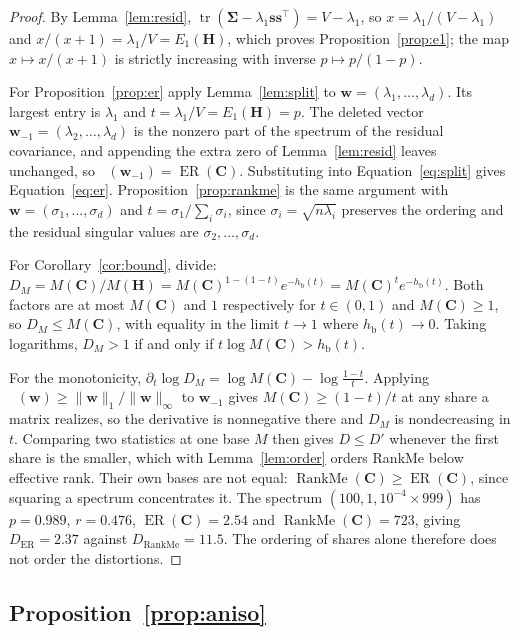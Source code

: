 \documentclass{article}
\theoremstyle{spaced}
\theoremstyle{definition}
\DeclareMathOperator{\ER}{ER}
\DeclareMathOperator{\RankMe}{RankMe}
\DeclareMathOperator{\Hexp}{H_{\exp}}
\DeclareMathOperator{\tr}{tr}
\newcommand{\bH}{\mathbf{H}}
\newcommand{\bC}{\mathbf{C}}
\newcommand{\bs}{\mathbf{s}}
\newcommand{\bw}{\mathbf{w}}
\newcommand{\bSig}{\boldsymbol{\Sigma}}
\newcommand{\hb}{h_{\mathrm{b}}}
\begin{document}
\begin{proof}
By Lemma~\ref{lem:resid}, $\tr(\bSig - \lambda_1\bs\bs^\top) = V - \lambda_1$, so $x = \lambda_1/(V-\lambda_1)$ and $x/(x+1) = \lambda_1/V = E_1(\bH)$, which proves Proposition~\ref{prop:e1}; the map $x \mapsto x/(x+1)$ is strictly increasing with inverse $p \mapsto p/(1-p)$.

For Proposition~\ref{prop:er} apply Lemma~\ref{lem:split} to $\bw = (\lambda_1,\dots,\lambda_d)$. Its largest entry is $\lambda_1$ and $t = \lambda_1/V = E_1(\bH) = p$. The deleted vector $\bw_{-1} = (\lambda_2,\dots,\lambda_d)$ is the nonzero part of the spectrum of the residual covariance, and appending the extra zero of Lemma~\ref{lem:resid} leaves $\Hexp$ unchanged, so $\Hexp(\bw_{-1}) = \ER(\bC)$. Substituting into Equation~\ref{eq:split} gives Equation~\ref{eq:er}. Proposition~\ref{prop:rankme} is the same argument with $\bw = (\sigma_1,\dots,\sigma_d)$ and $t = \sigma_1/\sum_i\sigma_i$, since $\sigma_i = \sqrt{n\lambda_i}$ preserves the ordering and the residual singular values are $\sigma_2,\dots,\sigma_d$.

For Corollary~\ref{cor:bound}, divide: $D_M = M(\bC)/M(\bH) = M(\bC)^{1-(1-t)}e^{-\hb(t)} = M(\bC)^{t}e^{-\hb(t)}$. Both factors are at most $M(\bC)$ and $1$ respectively for $t \in (0,1)$ and $M(\bC) \ge 1$, so $D_M \le M(\bC)$, with equality in the limit $t \to 1$ where $\hb(t) \to 0$. Taking logarithms, $D_M > 1$ if and only if $t\log M(\bC) > \hb(t)$.

For the monotonicity, $\partial_t \log D_M = \log M(\bC) - \log\frac{1-t}{t}$. Applying $\Hexp(\bw) \ge \|\bw\|_1/\|\bw\|_\infty$ to $\bw_{-1}$ gives $M(\bC) \ge (1-t)/t$ at any share a matrix realizes, so the derivative is nonnegative there and $D_M$ is nondecreasing in $t$. Comparing two statistics at one base $M$ then gives $D \le D'$ whenever the first share is the smaller, which with Lemma~\ref{lem:order} orders RankMe below effective rank. Their own bases are not equal: $\RankMe(\bC) \ge \ER(\bC)$, since squaring a spectrum concentrates it. The spectrum $(100, 1, 10^{-4} \times 999)$ has $p = 0.989$, $r = 0.476$, $\ER(\bC) = 2.54$ and $\RankMe(\bC) = 723$, giving $D_{\ER} = 2.37$ against $D_{\RankMe} = 11.5$. The ordering of shares alone therefore does not order the distortions.
\end{proof}

\subsection{Proposition~\ref{prop:aniso}}
\end{document}
